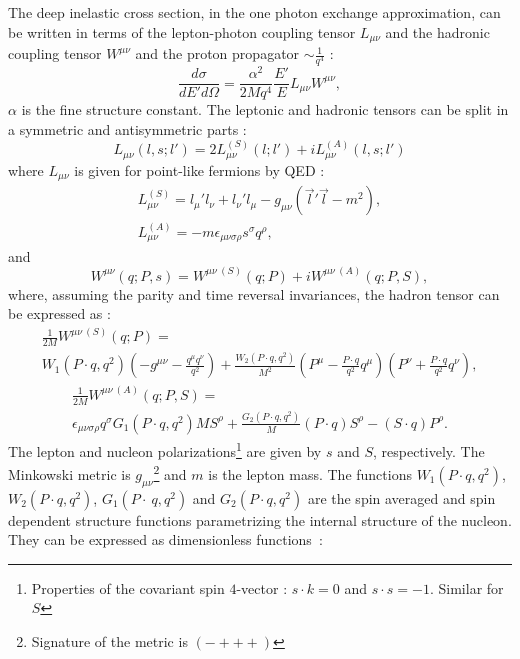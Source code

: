 The deep inelastic cross section, in the one photon exchange approximation, can be written in terms of the lepton-photon coupling tensor $L_{\mu\nu}$ and the hadronic coupling tensor $W^{\mu\nu}$ and the proton propagator $\sim \frac{1}{q^4}$ \cite{AEL} :
%
\begin{equation}
  \frac{d\sigma}{dE'd\Omega} = \frac{\alpha^2}{2Mq^4}\frac{E'}{E}L_{\mu\nu}W^{\mu\nu},
  \label{eq:coupling}
\end{equation}
%
$\alpha$ is the fine structure constant. The leptonic and hadronic tensors can be split in a symmetric and antisymmetric parts \cite{SchoolFermi} :
%
\begin{equation}
  L_{\mu\nu}(l,s;l') = 2{L^{(S)}_{\mu\nu}(l;l')+iL^{(A)}_{\mu\nu}(l,s;l')}
\end{equation}
%
where $L_{\mu\nu}$ is given for point-like fermions by QED :
%
\begin{equation}
  \begin{split}
    L^{(S)}_{\mu\nu} = l_{\mu}'l_{\nu} + l_{\nu}'l_{\mu} - g_{\mu\nu}(\vec{l}'\vec{l}-m^2), \\
    L^{(A)}_{\mu\nu} = -m\epsilon_{\mu\nu\sigma\rho}s^{\sigma}q^{\rho},
  \end{split}
\end{equation}
%
and
%
\begin{equation}
  W^{\mu\nu}(q;P,s) = W^{\mu\nu\ (S)}(q;P) + iW^{\mu\nu\ (A)}(q;P,S),
\end{equation}
%
where, assuming the parity and time reversal invariances, the hadron tensor can be expressed as :
%
\begin{equation}
  \begin{split}
    \frac{1}{2M}W^{\mu\nu\ (S)}(q;P) = \\
    W_1(P\cdot q,q^2)\left(-g^{\mu\nu}-\frac{q^{\mu}q^{\nu}}{q^2}\right)+\frac{W_2(P\cdot q,q^2)}{M^2}\left(P^{\mu}-\frac{P\cdot q}{q^2}q^{\mu}\right)\left(P^{\nu}+\frac{P\cdot q}{q^2}q^{\nu}\right),
  \end{split}
\end{equation}
%
\begin{equation}
  \begin{split}
    \frac{1}{2M}W^{\mu\nu\ (A)}(q;P,S) = \\
    \epsilon_{\mu\nu\sigma\rho}q^{\sigma}{G_1(P\cdot q,q^2)MS^{\rho}+\frac{G_2(P\cdot q,q^2)}{M}(P\cdot q)S^{\rho}-(S\cdot q)P^{\rho}}.
  \end{split}
\end{equation}
%
The lepton and nucleon polarizations\footnote{Properties of the covariant spin $4$-vector : $s \cdot k = 0$ and $s \cdot s = -1$. Similar for $S$} are given by $s$ and $S$, respectively. The Minkowski metric is $g_{\mu\nu}$\footnote{Signature of the metric is $(-+++)$} and $m$ is the lepton mass. The functions $W_1(P \cdot q,q^2)$, $W_2(P\cdot q,q^2)$, $G_1(P\cdot~q,q^2)$ and $G_2(P\cdot q,q^2)$ are the spin averaged and spin dependent structure functions parametrizing the internal structure of the nucleon. They can be expressed as dimensionless functions~:
